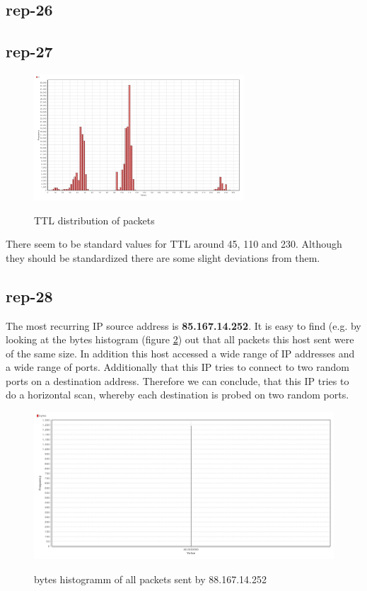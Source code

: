 \subsection*{rep-26}

\subsection*{rep-27}

\begin{figure}[H]
\center
\includegraphics[width=0.7\textwidth]{./chapters/plots/rep-27-ttl}\\
\caption{TTL distribution of packets}
\label{fig:ttl-distribution}
\end{figure}

There seem to be standard values for TTL around 45, 110 and 230. Although they should be standardized there are some slight deviations from them.

\subsection*{rep-28}
The most recurring IP source address is \textbf{85.167.14.252}.
It is easy to find (e.g. by looking at the bytes histogram (figure \ref{fig:bytes-histo}) out that all packets this host sent were of the same size. In addition this host accessed a wide range of IP addresses and a wide range of ports. Additionally that this IP tries to connect to two random ports on a destination address. Therefore we can conclude, that this IP tries to do a horizontal scan, whereby each destination is probed on two random ports.

\begin{figure}[H]
\center
\includegraphics[width=.7\textwidth]{./chapters/plots/rep-28-bytes-histo}\\
\caption{bytes histogramm of all packets sent by 88.167.14.252}
\label{fig:bytes-histo}
\end{figure}

